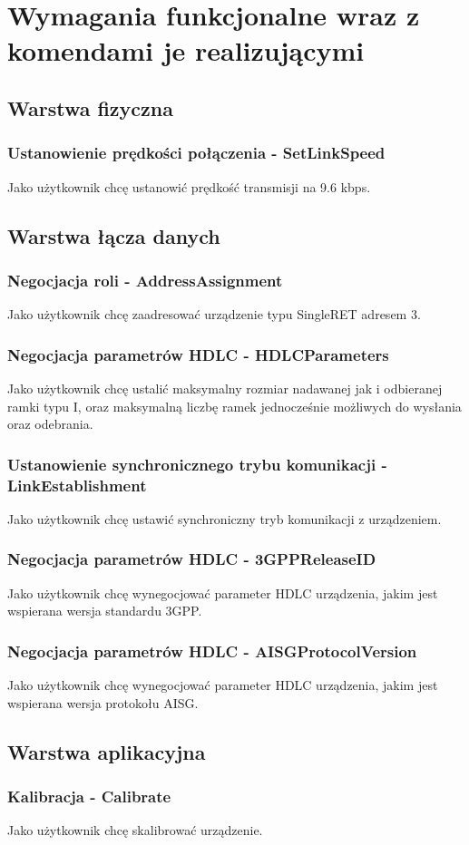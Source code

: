 \chapter{Wymagania funkcjonalne wraz z komendami je realizującymi}

	\section{Warstwa fizyczna}
		\subsection{Ustanowienie prędkości połączenia - SetLinkSpeed}
			Jako użytkownik chcę ustanowić prędkość transmisji na 9.6 kbps.

	\section{Warstwa łącza danych}
		\subsection{Negocjacja roli - AddressAssignment}
			Jako użytkownik chcę zaadresować urządzenie typu SingleRET adresem 3.

		\subsection{Negocjacja parametrów HDLC - HDLCParameters}
			Jako użytkownik chcę ustalić maksymalny rozmiar nadawanej jak i odbieranej ramki typu I, oraz maksymalną liczbę ramek jednocześnie możliwych do wysłania oraz odebrania.
			
		\subsection{Ustanowienie synchronicznego trybu komunikacji - LinkEstablishment}
			Jako użytkownik chcę ustawić synchroniczny tryb komunikacji z urządzeniem.

		 \subsection{Negocjacja parametrów HDLC - 3GPPReleaseID}
			Jako użytkownik chcę wynegocjować parameter HDLC urządzenia, jakim jest wspierana wersja standardu 3GPP.

		\subsection{Negocjacja parametrów HDLC - AISGProtocolVersion}
			Jako użytkownik chcę wynegocjować parameter HDLC urządzenia, jakim jest wspierana wersja protokołu AISG.

	\section{Warstwa aplikacyjna}
		\subsection{Kalibracja - Calibrate}
			Jako użytkownik chcę skalibrować urządzenie.
